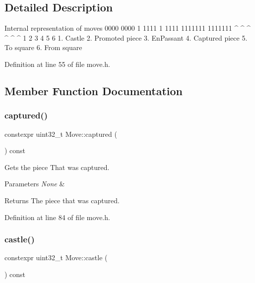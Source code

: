\subsection{Detailed Description}

\begin{DoxyPre}
    Internal representation of moves
    0000 0000 1 1111 1 1111 1111111 1111111 
              ^   ^  ^   ^      ^       ^
              1   2  3   4      5       6
    1. Castle
    2. Promoted piece
    3. EnPassant
    4. Captured piece
    5. To square
    6. From square
   \end{DoxyPre}
 

Definition at line 55 of file move.\+h.



\subsection{Member Function Documentation}
\mbox{\label{classMove_a5a8811a7e6ee7fe36675d49038f2ea2b}} 
\subsubsection{\texorpdfstring{captured()}{captured()}}
{\footnotesize\ttfamily constexpr uint32\+\_\+t Move\+::captured (\begin{DoxyParamCaption}{ }\end{DoxyParamCaption}) const\hspace{0.3cm}{\ttfamily [inline]}}



Gets the piece That was captured. 


\begin{DoxyParams}{Parameters}
{\em None} & \\
\hline
\end{DoxyParams}
\begin{DoxyReturn}{Returns}
The piece that was captured. 
\end{DoxyReturn}


Definition at line 84 of file move.\+h.

\mbox{\label{classMove_a35d7341c2a9074102451bf4df0d8b4c2}} 
\subsubsection{\texorpdfstring{castle()}{castle()}}
{\footnotesize\ttfamily constexpr uint32\+\_\+t Move\+::castle (\begin{DoxyParamCaption}{ }\end{DoxyParamCaption}) const\hspace{0.3cm}{\ttfamily [inline]}}



